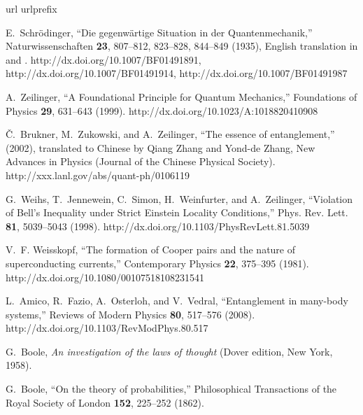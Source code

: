 \documentclass[pra,amsfonts,showpacs,showkeys,preprint]{revtex4}
\begin{document}
\begin{thebibliography}{10}
\newcommand{\enquote}[1]{``#1''}
\expandafter\ifx\csname url\endcsname\relax
  \def\url#1{{#1}}\fi
\expandafter\ifx\csname urlprefix\endcsname\relax\def\urlprefix{}\fi

E.~Schr{\"{o}}dinger, \enquote{Die gegenw{\"{a}}rtige {S}ituation in der
  {Q}uantenmechanik,} Naturwissenschaften {\bf 23}, 807--812, 823--828,
  844--849 (1935), {E}nglish translation in \cite{trimmer} and \cite[pp.
  152-167]{wheeler-Zurek:83}.
\newline http://dx.doi.org/10.1007/BF01491891,
  http://dx.doi.org/10.1007/BF01491914, http://dx.doi.org/10.1007/BF01491987

A.~Zeilinger, \enquote{A Foundational Principle for Quantum Mechanics,}
  Foundations of Physics {\bf 29}, 631--643 (1999).
\newline http://dx.doi.org/10.1023/A:1018820410908

{\v{C}}.~Brukner, M.~Zukowski, and A.~Zeilinger, \enquote{The essence of
  entanglement,}  (2002), translated to Chinese by Qiang Zhang and Yond-de
  Zhang, New Advances in Physics (Journal of the Chinese Physical Society).
\newline http://xxx.lanl.gov/abs/quant-ph/0106119

G.~Weihs, T.~Jennewein, C.~Simon, H.~Weinfurter, and A.~Zeilinger,
  \enquote{Violation of {B}ell's Inequality under Strict Einstein Locality
  Conditions,} Phys. Rev. Lett. {\bf 81}, 5039--5043 (1998).
\newline http://dx.doi.org/10.1103/PhysRevLett.81.5039

V.~F. Weisskopf, \enquote{The formation of {C}ooper pairs and the nature of
  superconducting currents,} Contemporary Physics {\bf 22}, 375--395 (1981).
\newline http://dx.doi.org/10.1080/00107518108231541

L.~Amico, R.~Fazio, A.~Osterloh, and V.~Vedral, \enquote{Entanglement in
  many-body systems,} Reviews of Modern Physics {\bf 80}, 517--576 (2008).
\newline http://dx.doi.org/10.1103/RevModPhys.80.517

G.~Boole, {\em An investigation of the laws of thought\/} (Dover edition, New
  York, 1958).

G.~Boole, \enquote{On the theory of probabilities,} Philosophical Transactions
  of the Royal Society of London {\bf 152}, 225--252 (1862).


\end{thebibliography}
\end{document}
